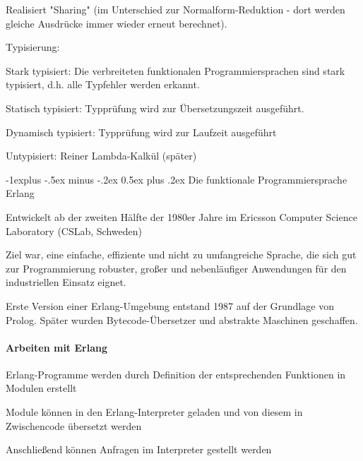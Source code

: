 \documentclass[10pt]{article}
\makeatletter
\renewcommand{\subsection}{\@startsection{subsection}{2}{0mm}%
                                {-1explus -.5ex minus -.2ex}%
                                {0.5ex plus .2ex}%
                                {\normalfont\normalsize\bfseries}}
\makeatother
\begin{document}
\begin{itemize*}
\begin{itemize*}
\begin{itemize*}
\begin{itemize*}
      \item Realisiert "Sharing" (im Unterschied zur Normalform-Reduktion - dort werden gleiche Ausdrücke immer wieder erneut berechnet).
    \end{itemize*}
  \end{itemize*}
  \item Typisierung:
  \begin{itemize*}
    \item Stark typisiert: Die verbreiteten funktionalen Programmiersprachen sind stark typisiert, d.h. alle Typfehler werden erkannt.
    \begin{itemize*}
      \item Statisch typisiert: Typprüfung wird zur Übersetzungszeit ausgeführt.
      \item Dynamisch typisiert: Typprüfung wird zur Laufzeit ausgeführt
    \end{itemize*}
    \item Untypisiert: Reiner Lambda-Kalkül (später)
  \end{itemize*}
\end{itemize*}

\subsection{Die funktionale Programmiersprache Erlang}
\begin{itemize*}
  \item Entwickelt ab der zweiten Hälfte der 1980er Jahre im Ericsson Computer Science Laboratory (CSLab, Schweden)
  \item Ziel war, eine einfache, effiziente und nicht zu umfangreiche Sprache, die sich gut zur Programmierung robuster, großer und nebenläufiger Anwendungen für den industriellen Einsatz eignet.
  \item Erste Version einer Erlang-Umgebung entstand 1987 auf der Grundlage von Prolog. Später wurden Bytecode-Übersetzer und abstrakte Maschinen geschaffen.
\end{itemize*}

\paragraph{Arbeiten mit Erlang}
\begin{itemize*}
  \item Erlang-Programme werden durch Definition der entsprechenden Funktionen in Modulen erstellt
  \item Module können in den Erlang-Interpreter geladen und von diesem in Zwischencode übersetzt werden
  \item Anschließend können Anfragen im Interpreter gestellt werden
\end{itemize*}


\end{itemize*}
\end{document}
